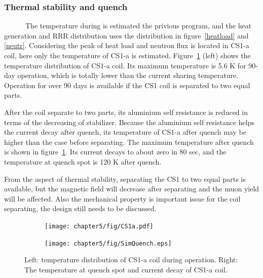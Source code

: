 \subsubsection{Thermal stability and quench}
~~~~~~The temperature during is estimated the privious program, and the heat generation and RRR distribution uses the distribution in figure~\ref{heatload} and \ref{neutr}.
Considering the peak of heat load and neutron flux is located in CS1-a coil, here only the temperature of CS1-a is estimated.
Figure~\ref{thequen} (left) shows the temperature distribution of CS1-a coil.
Its maximum temperature is 5.6 K for 90-day operation, which is totally lower than the current sharing temperature.
Operation for over 90 days is available if the CS1 coil is separated to two equal parts.

After the coil separate to two parts, its aluminium self resistance is reduced in terms of the decreasing of stabilizer.
Because the aluminium self resistance helps the current decay after quench, its temperature of CS1-a after quench may be higher than the case before separating.
The maximum temperature after quench is shown in figure~\ref{thequen}.
Its current decays to about zero in 80 sec, and the temperature at quench spot is 120 K after quench.

From the aspect of thermal stability, separating the CS1 to two equal parts is available, but the magnetic field will decrease after separating and the muon yield will be affected.
Also the mechanical property is important issue for the coil separating, the design still needs to be discussed.
\begin{figure}[H]
 \begin{subfigure}{0.3\textwidth}
  \centering
  \texttt{[image: chapter5/fig/CS1a.pdf]}
 \end{subfigure}
 \hspace{0.2\textwidth}
 \begin{subfigure}{0.3\textwidth}
  \centering
  \texttt{[image: chapter5/fig/SimQuench.eps]}
 \end{subfigure}
 \caption{Left: temperature distribution of CS1-a coil during operation. Right: The temperature at quench spot and current decay of CS1-a coil.}
 \label{thequen}
\end{figure}
